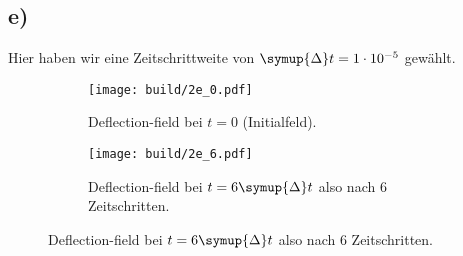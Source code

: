 \subsection*{e)}
Hier haben wir eine Zeitschrittweite von $\symup{\Delta} t = \num{1e-5}$ gewählt.
\begin{figure}
    \begin{subfigure}{0.48 \textwidth}
        \centering
        \texttt{[image: build/2e\_0.pdf]}
        \caption{Deflection-field bei $t = 0$ (Initialfeld).}
    \end{subfigure}
    \hfill
    \begin{subfigure}{0.48 \textwidth}  
        \centering  
        \texttt{[image: build/2e\_6.pdf]}
        \caption{Deflection-field bei $t = 6 \symup{\Delta}t$ also nach 6 Zeitschritten.}
    \end{subfigure}
\end{figure}